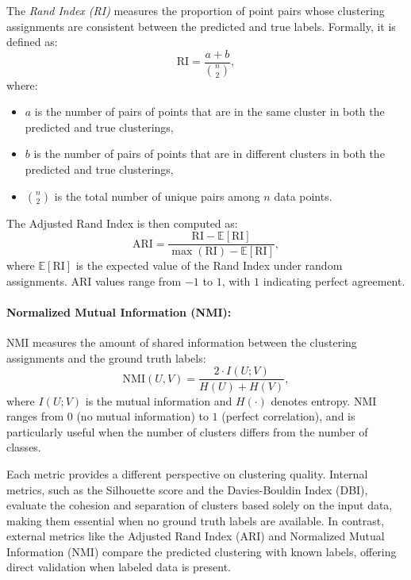The \emph{Rand Index (RI)} measures the proportion of point pairs whose
clustering assignments are consistent between the predicted and true labels.
Formally, it is defined as:
\begin{equation}
    \text{RI} = \frac{a + b}{\binom{n}{2}},
\end{equation}
where:
\begin{itemize}
    \item $a$ is the number of pairs of points that are in the same cluster in both the predicted and true clusterings,
    \item $b$ is the number of pairs of points that are in different clusters in both the predicted and true clusterings,
    \item $\binom{n}{2}$ is the total number of unique pairs among $n$ data points.
\end{itemize}

The Adjusted Rand Index is then computed as:
\begin{equation}
    \text{ARI} = \frac{\text{RI} - \mathbb{E}[\text{RI}]}{\max(\text{RI}) - \mathbb{E}[\text{RI}]},
\end{equation}
where $\mathbb{E}[\text{RI}]$ is the expected value of the Rand Index under random assignments. ARI values range from $-1$ to $1$, with $1$ indicating perfect agreement.

\paragraph{Normalized Mutual Information (NMI):} NMI measures the amount of shared information between the clustering
assignments and the ground truth labels:
\begin{equation}
    \text{NMI}(U, V) = \frac{2 \cdot I(U; V)}{H(U) + H(V)},
\end{equation}
where $I(U; V)$ is the mutual information and $H(\cdot)$ denotes entropy. NMI
ranges from $0$ (no mutual information) to $1$ (perfect correlation), and is
particularly useful when the number of clusters differs from the number of
classes.

Each metric provides a different perspective on clustering quality. Internal
metrics, such as the Silhouette score and the Davies-Bouldin Index (DBI),
evaluate the cohesion and separation of clusters based solely on the input
data, making them essential when no ground truth labels are available. In
contrast, external metrics like the Adjusted Rand Index (ARI) and Normalized
Mutual Information (NMI) compare the predicted clustering with known labels,
offering direct validation when labeled data is present.

